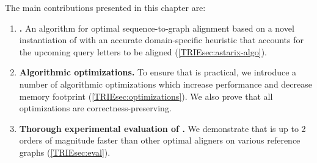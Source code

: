 \begin{samepage}
The main contributions presented in this chapter are:
	
\begin{enumerate}
	\item \textbf{\astarix.} An algorithm for optimal sequence-to-graph
	alignment based on a novel instantiation of \A with an accurate
	domain-specific heuristic that accounts for the upcoming query letters to be
	aligned (\cref{TRIEsec:astarix-algo}).
	\item \textbf{Algorithmic optimizations.}
	To ensure that \astarix is practical, we introduce a number of algorithmic
	optimizations which increase performance and decrease memory footprint
	(\cref{TRIEsec:optimizations}). We also prove that all optimizations are
	correctness-preserving.
	\item \textbf{Thorough experimental evaluation of \astarix.}
	We demonstrate that \astarix is up to 2 orders of magnitude faster than
	other optimal aligners on various reference graphs (\cref{TRIEsec:eval}).
\end{enumerate}
\end{samepage}
